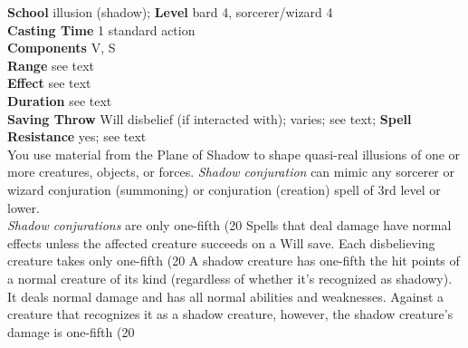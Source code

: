 \textbf{School} illusion (shadow); \textbf{Level} bard 4, sorcerer/wizard 4\\
\textbf{Casting Time} 1 standard action\\
\textbf{Components} V, S\\
\textbf{Range} see text\\
\textbf{Effect} see text\\
\textbf{Duration} see text\\
\textbf{Saving Throw }Will disbelief (if interacted with); varies; see text; \textbf{Spell Resistance} yes; see text\\
You use material from the Plane of Shadow to shape quasi-real illusions of one or more creatures, objects, or forces. \textit{Shadow conjuration }can mimic any sorcerer or wizard conjuration (summoning) or conjuration (creation) spell of 3rd level or lower.\\
\textit{Shadow conjurations }are only one-fifth (20%
Spells that deal damage have normal effects unless the affected creature succeeds on a Will save. Each disbelieving creature takes only one-fifth (20%
A shadow creature has one-fifth the hit points of a normal creature of its kind (regardless of whether it's recognized as shadowy). It deals normal damage and has all normal abilities and weaknesses. Against a creature that recognizes it as a shadow creature, however, the shadow creature's damage is one-fifth (20%
